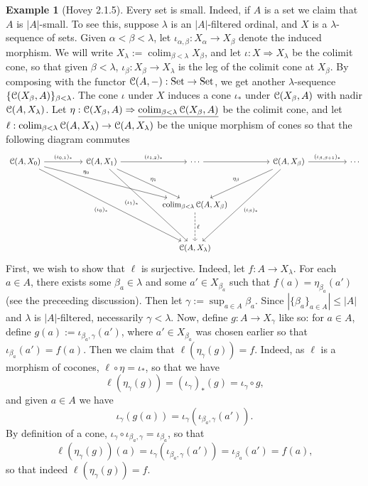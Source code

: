 \documentclass{amsart}
\theoremstyle{plain}
\theoremstyle{definition}
\newtheorem{example}[theorem]{Example}
\newcommand{\0}{\mathbf{0}}
\newcommand{\cC}{\mathcal C}
\renewcommand{\(}{\left(}
\renewcommand{\)}{\right)}
\def\on{\operatorname}
\def\scr{\EuScript}
\def\Set{\on{Set}}
\def\cC{\scr{C}}
\DeclareMathOperator*{\colim}{colim}
\begin{document}
\begin{example}[Hovey 2.1.5]\label{2.1.5}
  Every set is small. Indeed, if $A$ is a set we claim that $A$ is $|A|$-small. To see this, suppose $\lambda$ is an $|A|$-filtered ordinal, and $X$ is a $\lambda$-sequence of sets. Given $\alpha<\beta<\lambda$, let $\iota_{\alpha,\beta}:X_\alpha\to X_\beta$ denote the induced morphism. We will write $X_\lambda:=\colim_{\beta<\lambda}X_\beta$, and let $\iota:X\Rightarrow X_\lambda$ be the colimit cone, so that given $\beta<\lambda$, $\iota_\beta:X_\beta\to X_\lambda$ is the leg of the colimit cone at $X_\beta$. By composing with the functor $\cC(A,-):\Set\to\Set$, we get another $\lambda$-sequence $\{\cC(X_\beta,A)\}_{\beta<\lambda}$. The cone $\iota$ under $X$ induces a cone $\iota_*$ under $\cC(X_\beta,A)$ with nadir $\cC(A,X_\lambda)$. Let $\eta:\cC(X_\beta,A)\Rightarrow\underline{\colim_{\beta<\lambda}\cC(X_\beta,A)}$ be the colimit cone, and let $\ell:\colim_{\beta<\lambda}\cC(A,X_\lambda)\to\cC(A,X_\lambda)$ be the unique morphism of cones so that the following diagram commutes
  \[\begin{tikzcd}
    {\cC(A,X_0)} && {\cC(A,X_1)} && \cdots && {\cC(A,X_\beta)} && \cdots \\
    \\
    &&&& {\colim_{\beta<\lambda}\cC(A,X_\beta)} \\
    \\
    &&&& {\cC(A,X_\lambda)}
    \arrow["{(\iota_{0,1})_*}", from=1-1, to=1-3]
    \arrow["{(\iota_{1,2})_*}", from=1-3, to=1-5]
    \arrow[from=1-5, to=1-7]
    \arrow["{(\iota_{\beta,\beta+1})_*}", from=1-7, to=1-9]
    \arrow["{\eta_\beta}"', from=1-7, to=3-5]
    \arrow["{\eta_1}", from=1-3, to=3-5]
    \arrow["{\eta_0}"{pos=0.3}, from=1-1, to=3-5]
    \arrow["{(\iota_\beta)_*}", from=1-7, to=5-5]
    \arrow["\ell", dashed, from=3-5, to=5-5]
    \arrow["{(\iota_1)_*}"'{pos=0.4}, from=1-3, to=5-5]
    \arrow["{(\iota_0)_*}"', from=1-1, to=5-5]
  \end{tikzcd}\]
  First, we wish to show that $\ell$ is surjective. Indeed, let $f:A\to X_\lambda$. For each $a\in A$, there exists some $\beta_a\in\lambda$ and some $a'\in X_{\beta_a}$ such that $f(a)=\eta_{\beta_a}(a')$ (see the preceeding discussion). Then let $\gamma:=\sup_{a\in A}\beta_a$. Since $|\{\beta_a\}_{a\in A}|\leq|A|$ and $\lambda$ is $|A|$-filtered, necessarily $\gamma<\lambda$. Now, define $g:A\to X_\gamma$ like so: for $a\in A$, define $g(a):=\iota_{\beta_a,\gamma}(a')$, where $a'\in X_{\beta_a}$ was chosen earlier so that $\iota_{\beta_a}(a')=f(a)$. Then we claim that $\ell(\eta_\gamma(g))=f$. Indeed, as $\ell$ is a morphism of cocones, $\ell\circ\eta=\iota_*$, so that we have
  \[\ell(\eta_\gamma(g))=(\iota_\gamma)_*(g)=\iota_\gamma\circ g,\]
  and given $a\in A$ we have 
  \[\iota_\gamma(g(a))=\iota_\gamma(\iota_{\beta_a,\gamma}(a')).\] 
  By definition of a cone, $\iota_{\gamma}\circ\iota_{\beta_a,\gamma}=\iota_{\beta_a}$, so that
  \[\ell(\eta_{\gamma}(g))(a)=\iota_\gamma(\iota_{\beta_a,\gamma}(a'))=\iota_{\beta_a}(a')=f(a),\]
  so that indeed $\ell(\eta_\gamma(g))=f$.


\end{example}
\end{document}
